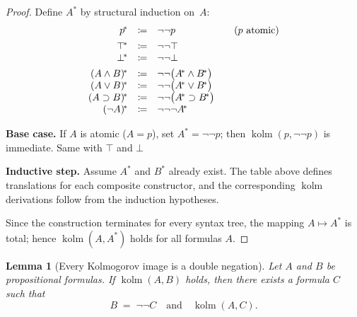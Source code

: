 \documentclass{article}
\newtheorem{lemma}{Lemma}
\begin{document}
  \begin{proof}
  Define $A^{\!*}$ by structural induction on $A$:
  \[
  \begin{array}{rcl@{\qquad}l}
  p^{\!*}              &\coloneqq& \neg\neg p &(\text{$p$ atomic})\\[4pt]
  \top^{\!*}           &\coloneqq& \neg \neg \top\\
  \bot^{\!*}           &\coloneqq& \neg \neg \bot\\[4pt]
  (A \land B)^{\!*}    &\coloneqq& \neg\neg\bigl(A^{\!*}\land B^{\!*}\bigr)\\
  (A \lor  B)^{\!*}    &\coloneqq& \neg\neg\bigl(A^{\!*}\lor  B^{\!*}\bigr)\\
  (A \supset B)^{\!*}  &\coloneqq& \neg\neg\bigl(A^{\!*}\supset B^{\!*}\bigr)\\
  (\neg A)^{\!*}       &\coloneqq& \neg\neg\neg A^{\!*}
  
  \end{array}
  \]
  
  \noindent
  \textbf{Base case.}  If $A$ is atomic ($A=p$), set $A^{\!*}=\neg\neg p$; then
  $\operatorname{kolm}(p,\neg\neg p)$ is immediate. Same with $\top$ and $\bot$
  
  \smallskip
  \noindent
  \textbf{Inductive step.}  Assume $A^{\!*}$ and $B^{\!*}$ already exist.
  The table above defines translations for each composite constructor,
  and the corresponding $\operatorname{kolm}$ derivations follow from
  the induction hypotheses.
  
  \smallskip
  Since the construction terminates for every syntax tree, the
  mapping $A\mapsto A^{\!*}$ is total; hence
  $\operatorname{kolm}(A,A^{\!*})$ holds for all formulas $A$.
  \end{proof}


  \begin{lemma}[Every Kolmogorov image is a double negation]
    \label{lem:outer-dneg}
    Let $A$ and $B$ be propositional formulas.
    If \(\operatorname{kolm}(A,B)\) holds, then there exists a formula
    \(C\) such that
    \[
       B \;=\; \neg\neg C
       \quad\text{and}\quad
       \operatorname{kolm}(A,C).
    \]
    \end{lemma}
    
\end{document}
